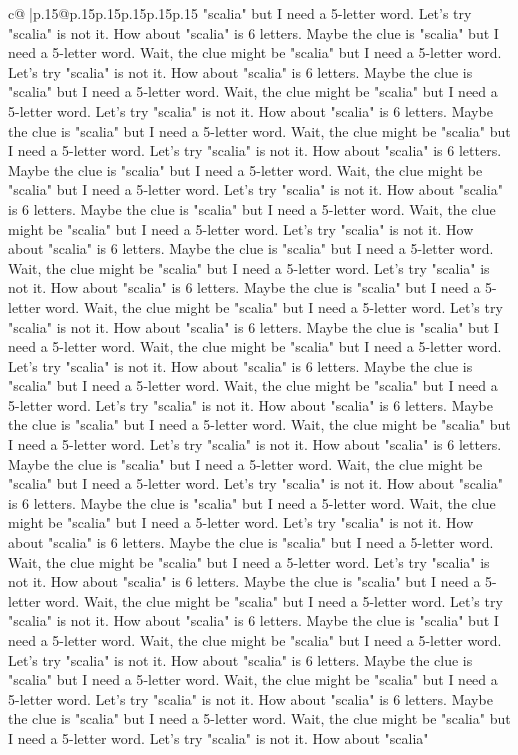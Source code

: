 \documentclass{article}
\begin{document}
{\begin{supertabular}{c@{$\;$}|p{.15\linewidth}@{}p{.15\linewidth}p{.15\linewidth}p{.15\linewidth}p{.15\linewidth}p{.15\linewidth}}
{{{"scalia" but I need a 5{-}letter word. Let's try "scalia" is not it. How about "scalia" is 6 letters. Maybe the clue is "scalia" but I need a 5{-}letter word. Wait, the clue might be "scalia" but I need a 5{-}letter word. Let's try "scalia" is not it. How about "scalia" is 6 letters. Maybe the clue is "scalia" but I need a 5{-}letter word. Wait, the clue might be "scalia" but I need a 5{-}letter word. Let's try "scalia" is not it. How about "scalia" is 6 letters. Maybe the clue is "scalia" but I need a 5{-}letter word. Wait, the clue might be "scalia" but I need a 5{-}letter word. Let's try "scalia" is not it. How about "scalia" is 6 letters. Maybe the clue is "scalia" but I need a 5{-}letter word. Wait, the clue might be "scalia" but I need a 5{-}letter word. Let's try "scalia" is not it. How about "scalia" is 6 letters. Maybe the clue is "scalia" but I need a 5{-}letter word. Wait, the clue might be "scalia" but I need a 5{-}letter word. Let's try "scalia" is not it. How about "scalia" is 6 letters. Maybe the clue is "scalia" but I need a 5{-}letter word. Wait, the clue might be "scalia" but I need a 5{-}letter word. Let's try "scalia" is not it. How about "scalia" is 6 letters. Maybe the clue is "scalia" but I need a 5{-}letter word. Wait, the clue might be "scalia" but I need a 5{-}letter word. Let's try "scalia" is not it. How about "scalia" is 6 letters. Maybe the clue is "scalia" but I need a 5{-}letter word. Wait, the clue might be "scalia" but I need a 5{-}letter word. Let's try "scalia" is not it. How about "scalia" is 6 letters. Maybe the clue is "scalia" but I need a 5{-}letter word. Wait, the clue might be "scalia" but I need a 5{-}letter word. Let's try "scalia" is not it. How about "scalia" is 6 letters. Maybe the clue is "scalia" but I need a 5{-}letter word. Wait, the clue might be "scalia" but I need a 5{-}letter word. Let's try "scalia" is not it. How about "scalia" is 6 letters. Maybe the clue is "scalia" but I need a 5{-}letter word. Wait, the clue might be "scalia" but I need a 5{-}letter word. Let's try "scalia" is not it. How about "scalia" is 6 letters. Maybe the clue is "scalia" but I need a 5{-}letter word. Wait, the clue might be "scalia" but I need a 5{-}letter word. Let's try "scalia" is not it. How about "scalia" is 6 letters. Maybe the clue is "scalia" but I need a 5{-}letter word. Wait, the clue might be "scalia" but I need a 5{-}letter word. Let's try "scalia" is not it. How about "scalia" is 6 letters. Maybe the clue is "scalia" but I need a 5{-}letter word. Wait, the clue might be "scalia" but I need a 5{-}letter word. Let's try "scalia" is not it. How about "scalia" is 6 letters. Maybe the clue is "scalia" but I need a 5{-}letter word. Wait, the clue might be "scalia" but I need a 5{-}letter word. Let's try "scalia" is not it. How about "scalia" is 6 letters. Maybe the clue is "scalia" but I need a 5{-}letter word. Wait, the clue might be "scalia" but I need a 5{-}letter word. Let's try "scalia" is not it. How about "scalia" is 6 letters. Maybe the clue is "scalia" but I need a 5{-}letter word. Wait, the clue might be "scalia" but I need a 5{-}letter word. Let's try "scalia" is not it. How about "scalia" }}}
\end{supertabular}}
\end{document}
